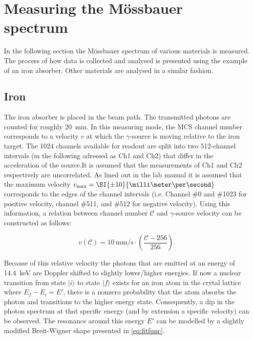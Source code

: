
\section{Measuring the Mössbauer spectrum}
\label{sec:mössbauer-spectrum}

In the following section the Mössbauer spectrum of various materials is measured. The
process of how data is collected and analysed is presented using the example of an
iron absorber. Other materials are analysed in a similar fashion.

\subsection{Iron}
\label{ssec:iron}

The iron absorber is placed in the beam path. The transmitted photons are counted for
roughly \SI{20}{\minute}. In this measuring mode, the MCS channel number corresponds
to a velocity $v$ at which the $\gamma$-source is moving relative to the iron target.
The 1024 channels available for readout are split into two 512-channel intervals (in
the following adressed as Ch1 and Ch2) that differ in the acceleration of the source.It is assumed that the measurements of Ch1 and Ch2 respectively are uncorrelated.
As lined out in the lab manual \cite{Sch17} it is assumed that the maximum velocity
$v_\text{max}=\SI{\pm10}{\milli\meter\per\second}$ corresponds to the edges of the
channel intervals (i.e. Channel \#0 and \#1023 for positive velocity, channel \#511,
and \#512 for negative velocity). Using this information, a relation between channel
number $\mathcal{C}$ and $\gamma$-source velocity can be constructed as follows:

\begin{equation}
\label{eq:channel-to-velocity}
v(\mathcal{C}) = \SI{10}{\milli\meter\per\second}\cdot\left(\frac{\mathcal{C}-256}{256}\right).
\end{equation}

Because of this relative velocity the photons that are emitted at an energy of
\SI{14.4}{\kilo\electronvolt} are Doppler shifted to slightly lower/higher energies.
If now a nuclear transition from state $|i\rangle$ to state $|f\rangle$ exists for an
iron atom in the crytal lattice where $E_f-E_i=E'$, there is a nonzero probability
that the atom absorbs the photon and transitions to the higher energy state.
Consequently, a dip in the photon spectrum at that specific energy (and by extension
a specific velocity) can be observed. The resonance around this energy $E'$ can be
modelled by a slightly modified Breit-Wigner shape presented in \autoref{eq:fitfunc}.

